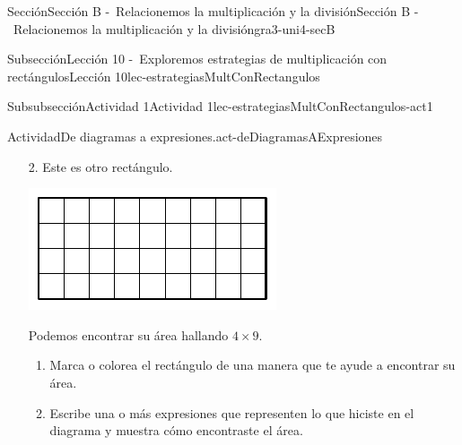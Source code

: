 \begin{sectionptx}{Sección}{Sección B -~Relacionemos la multiplicación y la división}{}{Sección B -~Relacionemos la multiplicación y la división}{}{}{gra3-uni4-secB}
\typeout{************************************************}
%
\begin{subsectionptx}{Subsección}{Lección 10 -~Exploremos estrategias de multiplicación con rectángulos}{}{Lección 10}{}{}{lec-estrategiasMultConRectangulos}
%
%
\typeout{************************************************}
\typeout{************************************************}
%
\begin{subsubsectionptx}{Subsubsección}{Actividad 1}{}{Actividad 1}{}{}{lec-estrategiasMultConRectangulos-act1}
\begin{activity}{Actividad}{De diagramas a expresiones.}{act-deDiagramasAExpresiones}%
%
\begin{enumerate}
\item[2.] Este es otro rectángulo.%
\begin{image}{0}{1}{0}{}%
\includegraphics[max width=\linewidth, center]{external/svg-source/tikz-file-153048.pdf}
\end{image}%
Podemos encontrar su área hallando \(4 \times 9\).%
%
\begin{enumerate}
\item{}Marca o colorea el rectángulo de una manera que te ayude a encontrar su área.%
\item{}Escribe una o más expresiones que representen lo que hiciste en el diagrama y muestra cómo encontraste el área.%
\end{enumerate}
\end{enumerate}
\end{activity}%
\end{subsubsectionptx}
%
%
\typeout{************************************************}

\end{subsectionptx}
\end{sectionptx}

